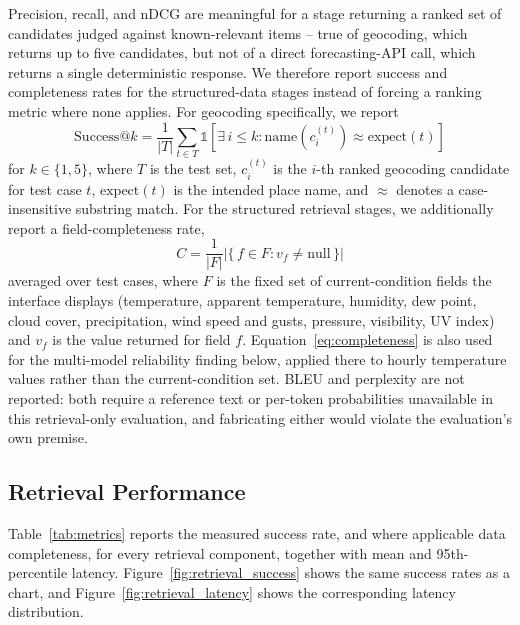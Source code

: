 \documentclass[sigconf,natbib=true,anonymous=true]{acmart}
\begin{document}
Precision, recall, and nDCG \citep{jarvelin2002ndcg} are meaningful for a stage returning a ranked set of candidates judged against known-relevant items -- true of geocoding, which returns up to five candidates, but not of a direct forecasting-API call, which returns a single deterministic response. We therefore report success and completeness rates for the structured-data stages instead of forcing a ranking metric where none applies. For geocoding specifically, we report
\begin{equation}
  \mathrm{Success@}k = \frac{1}{|T|} \sum_{t \in T} \mathbb{1}\!\left[\exists\, i \le k : \mathrm{name}(c_i^{(t)}) \approx \mathrm{expect}(t)\right]
  \label{eq:successk}
\end{equation}
for $k \in \{1, 5\}$, where $T$ is the test set, $c_i^{(t)}$ is the $i$-th ranked geocoding candidate for test case $t$, $\mathrm{expect}(t)$ is the intended place name, and $\approx$ denotes a case-insensitive substring match. For the structured retrieval stages, we additionally report a field-completeness rate,
\begin{equation}
  C = \frac{1}{|F|} \left| \{\, f \in F : v_f \ne \mathrm{null} \,\} \right|
  \label{eq:completeness}
\end{equation}
averaged over test cases, where $F$ is the fixed set of current-condition fields the interface displays (temperature, apparent temperature, humidity, dew point, cloud cover, precipitation, wind speed and gusts, pressure, visibility, UV index) and $v_f$ is the value returned for field $f$. Equation~\ref{eq:completeness} is also used for the multi-model reliability finding below, applied there to hourly temperature values rather than the current-condition set. BLEU \citep{papineni2002bleu} and perplexity are not reported: both require a reference text or per-token probabilities unavailable in this retrieval-only evaluation, and fabricating either would violate the evaluation's own premise.

\subsection{Retrieval Performance}

Table~\ref{tab:metrics} reports the measured success rate, and where applicable data completeness, for every retrieval component, together with mean and 95th-percentile latency. Figure~\ref{fig:retrieval_success} shows the same success rates as a chart, and Figure~\ref{fig:retrieval_latency} shows the corresponding latency distribution.
\end{document}
